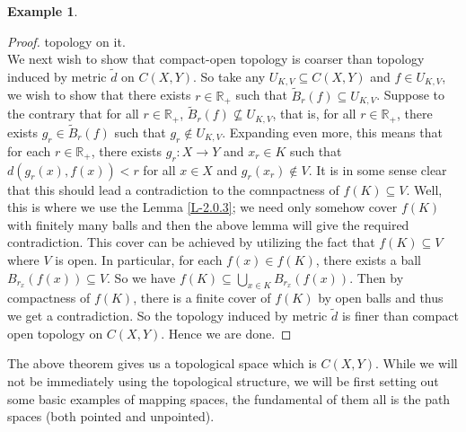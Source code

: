 \documentclass[letterpaper,11pt,twoside]{article}
\theoremstyle{definition}
\theoremstyle{definition}
\theoremstyle{definition}
\theoremstyle{definition}
\theoremstyle{definition}
\newtheorem*{example}{\textbf{Example}}
\theoremstyle{definition}
\theoremstyle{remark}
\theoremstyle{definition}
\newcommand{\R}[0]{\mathbb{R}}
\newcommand{\bunion}[0]{\bigcup}
\begin{document}
\begin{example}
\begin{proof}
topology on it. \\
        
        We next wish to show that compact-open topology is coarser than topology induced by metric $\tilde{d}$ on $C(X,Y)$. So take any $U_{K,V} \subseteq C(X,Y)$ and $f\in U_{K,V}$, we wish to show that there exists $r\in \R_+$ such that $\tilde{B}_{r}(f) \subseteq U_{K,V}$. Suppose to the contrary that for all $r\in \R_+$, $\tilde{B}_r(f) \not\subseteq U_{K,V}$, that is, for all $r\in \R_+$, there exists $g_r\in \tilde{B}_r(f)$ such that $g_r\notin U_{K,V}$. Expanding even more, this means that for each $r\in \R_+$, there exists $g_r : X\to Y$ and $x_r\in K$ such that $d(g_r(x),f(x)) < r$ for all $x\in X$ and $g_r(x_r) \notin V$. It is in some sense clear that this should lead a contradiction to the comnpactness of $f(K)\subseteq V$. Well, this is where we use the Lemma \ref{L-2.0.3}; we need only somehow cover $f(K)$ with finitely many balls and then the above lemma will give the required contradiction. This cover can be achieved by utilizing the fact that $f(K)\subseteq V$ where $V$ is open. In particular, for each $f(x) \in f(K)$, there exists a ball $B_{r_x}(f(x)) \subseteq V$. So we have $f(K) \subseteq \bunion_{x\in K} B_{r_x}(f(x))$. Then by compactness of $f(K)$, there is a finite cover of $f(K)$ by open balls and thus we get a contradiction. So the topology induced by metric $\tilde{d}$ is finer than compact open topology on $C(X,Y)$. Hence we are done.
    \end{proof}
\end{example}
    
    The above theorem gives us a topological space which is $C(X,Y)$. While we will not be immediately using the topological structure, we will be first setting out some basic examples of mapping spaces, the fundamental of them all is the path spaces (both pointed and unpointed).
\end{document}

